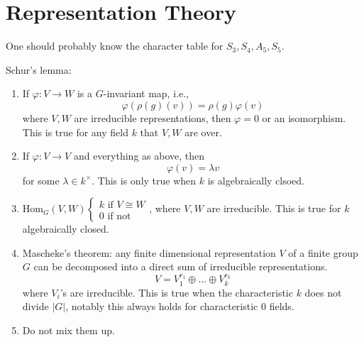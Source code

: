 \chapter{Representation Theory}




    

    


\begin{prop}
    One should probably know the character table for $S_3, S_4, A_5, S_5$.
\end{prop}

\begin{thm}
    Schur's lemma: 
    \begin{enumerate}
        \item If $\varphi: V\to W$ is a $G$-invariant map, i.e., 
        \begin{equation*}
            \varphi(\rho(g)(v))=\rho(g)\varphi(v)
        \end{equation*} 
        where $V,W$ are irreducible representations, then $\varphi=0$ or an isomorphism. This is true for any field $k$ that $V,W$ are over.
        \item If $\varphi: V\to V$ and everything as above, then 
        \begin{equation*}
            \varphi(v)=\lambda v
        \end{equation*}
        for some $\lambda\in k^\times$. This is only true when $k$ is algebraically clsoed.
        \item $\text{Hom}_G(V,W)\begin{cases}
            k \text{ if } V\cong W\\
            0 \text{ if  not}
        \end{cases}$, where $V,W$ are irreducible. This is true for $k$ algebraically closed.
        \item Mascheke's theorem: any finite dimensional representation $V$ of a finite group $G$ can be decomposed into a direct sum of irreducible representations.
        \begin{equation*}
            V=V_1^{r_1}\oplus\dots\oplus V_k^{r_k}
        \end{equation*}
        where $V_i$'s are irreducible. This is true when the characteristic $k$ does not divide $|G|$, notably this always holds for characteristic $0$ fields.
        \item Do not mix them up.
    \end{enumerate}
\end{thm}


